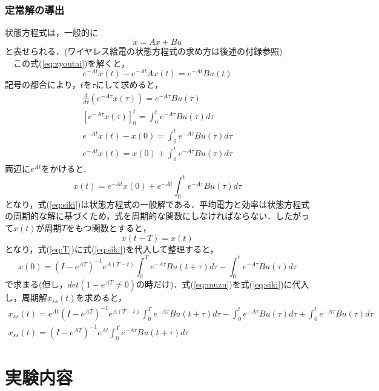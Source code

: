 \documentclass[12pt]{jarticle}
\begin{document}
\subsubsection{定常解の導出}
状態方程式は，一般的に
\begin{equation}
\label{eq:zyoutai}
\dot{x}=Ax+Bu
\end{equation}
と表せられる．(ワイヤレス給電の状態方程式の求め方は後述の付録参照)
\\　この式(\ref{eq:zyoutai})を解くと，
\begin{equation}
e^{-At}\dot{x}(t)-e^{-At}Ax(t)=e^{-At}Bu(t)
\end{equation}
記号の都合により，$tを\tau$にして求めると，
\begin{eqnarray}
\frac{d}{d\tau}(e^{-A\tau}x(\tau))=e^{-A\tau}Bu(\tau)\\
\left[e^{-A\tau}x(\tau)\right]^t_0=\int_{0}^{t}e^{-A\tau}Bu(\tau)d\tau\\
e^{-At}x(t)-x(0)=\int_{0}^{t}e^{-A\tau}Bu(\tau)d\tau\nonumber\\
e^{-At}x(t)=x(0)+\int_{0}^{t}e^{-A\tau}Bu(\tau)d\tau
\end{eqnarray}
$両辺にe^{At}をかけると,$
\begin{equation}
\label{eq:siki}
x(t)=e^{-At}x(0)+e^{-At}\int_{0}^{t}e^{-A\tau}Bu(\tau)d\tau
\end{equation}
となり，式(\ref{eq:siki})は状態方程式の一般解である．平均電力と効率は状態方程式の周期的な解に基づくため，式を周期的な関数にしなければならない．したがって$x(t)が周期Tをもつ関数とすると，$
\begin{equation}
\label{eq:T}
x(t+T)=x(t)
\end{equation}
となり，式(\ref{eq:T})に式(\ref{eq:siki})を代入して整理すると，
\begin{equation}
\label{eq:muzu}
x(0)=(I-e^{AT})^{-1}e^{A(T-t)}\int_{0}^{T}e^{-A\tau}Bu(t+\tau)d\tau-\int_{0}^{t}e^{-A\tau}Bu(\tau)d\tau
\end{equation}
で求まる(但し，$det(1-e^{AT}\neq0)$の時だけ)．式(\ref{eq:muzu})を式(\ref{eq:siki})に代入し，周期解$x_{ss}(t)$を求めると，
\begin{eqnarray}
x_{ss}(t)=e^{At}(I-e^{AT})^{-1}e^{A(T-t)}\int_{0}^{T}e^{-A\tau}Bu(t+\tau)d\tau-\int_{0}^{t}e^{-A\tau}Bu(\tau)d\tau+\int_{0}^{t}e^{-A\tau}Bu(\tau)d\tau\nonumber\\
x_{ss}(t)=(I-e^{AT})^{-1}e^{At}\int_{0}^{T}e^{-A\tau}Bu(t+\tau)d\tau
\label{eq:Tteizyou}
\end{eqnarray}

\clearpage
\section{実験内容}
\end{document}
